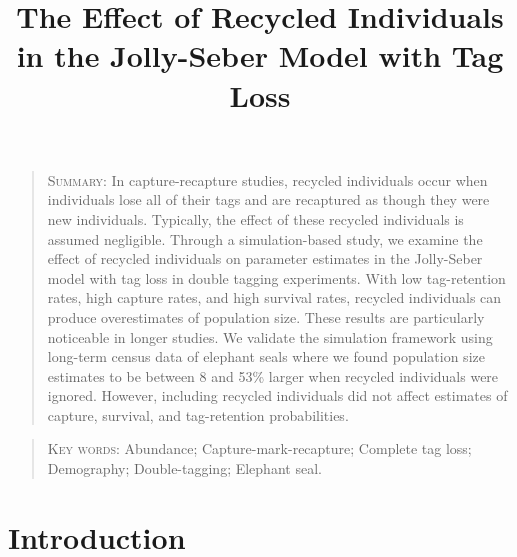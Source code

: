 \documentclass[12pt]{article}
\title{The Effect of Recycled Individuals in the Jolly-Seber Model with Tag
Loss}
\date{}
\begin{document}
\maketitle


\begin{quote}
\textsc{Summary:} In capture-recapture studies, recycled individuals occur
when individuals lose all of their tags and are recaptured as though they were new
individuals. Typically, the effect of these recycled individuals is
assumed negligible. Through a simulation-based study, we examine the
effect of recycled individuals on parameter estimates in the
Jolly-Seber model with tag loss \citep{Cowen:2006} in double tagging experiments. With low tag-retention
rates, high capture rates, and high survival rates, recycled individuals
can produce overestimates of population size. These results are
particularly noticeable in longer studies. We validate the simulation
framework using long-term census data of elephant seals where we found population size estimates to be between 8 and 53\% larger when recycled individuals were ignored. However, including recycled individuals did not affect estimates of capture, survival, and tag-retention probabilities.
\end{quote}

\begin{quote}
\begin{center} \textsc{Key words:} Abundance; Capture-mark-recapture; Complete tag loss; Demography; Double-tagging; Elephant seal. 
\end{center}
\end{quote}

\section{Introduction}\label{introduction}
\end{document}

